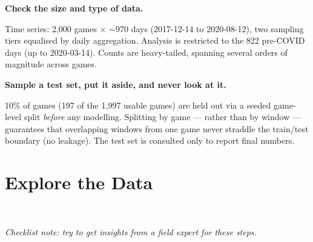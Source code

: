 \documentclass[11pt,a4paper]{article}
\newcommand{\StatusBadge}[2]{\colorbox{#1}{\textcolor{white}{\sffamily\bfseries\footnotesize\;#2\;}}}
\newcommand{\SectionStatus}[2]{\noindent\StatusBadge{#1}{#2}\par\medskip}
\newcommand{\chk}[1]{\item \textbf{#1}\par\nopagebreak\vspace{0.15em}}
\newcommand{\guidance}[1]{\textcolor{soft}{\small\itshape Checklist note: #1}\par\medskip}
\begin{document}
\begin{checklist}
\chk{Check the size and type of data.}
Time series: 2{,}000 games $\times$ $\sim$970 days (2017-12-14 to
2020-08-12), two sampling tiers equalised by daily aggregation. Analysis is
restricted to the 822 pre-COVID days (up to 2020-03-14). Counts are
heavy-tailed, spanning several orders of magnitude across games.

\chk{Sample a test set, put it aside, and never look at it.}
10\% of games (197 of the 1{,}997 usable games) are held out via a seeded
game-level split \emph{before} any modelling. Splitting by game --- rather
than by window --- guarantees that overlapping windows from one game never
straddle the train/test boundary (no leakage). The test set is consulted
only to report final numbers.

\end{checklist}

\section{Explore the Data}
\SectionStatus{stdone}{COMPLETED}
\guidance{try to get insights from a field expert for these steps.}
\end{document}
